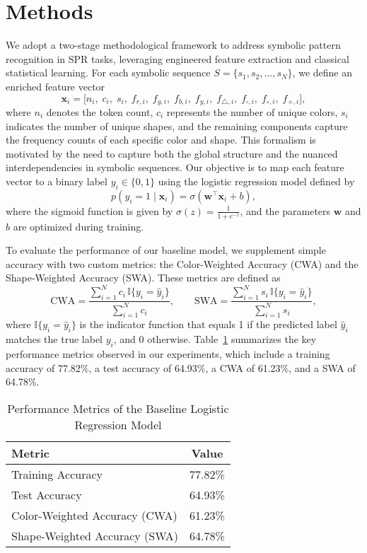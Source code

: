 \documentclass{article}
\begin{document}
\section{Methods}
We adopt a two-stage methodological framework to address symbolic pattern recognition in SPR tasks, leveraging engineered feature extraction and classical statistical learning. For each symbolic sequence \( S = \{s_1, s_2, \dots, s_N\} \), we define an enriched feature vector 
\[
\mathbf{x}_i = \Big[n_i,\; c_i,\; s_i,\; f_{r,i},\; f_{g,i},\; f_{b,i},\; f_{y,i},\; f_{\triangle,i},\; f_{\square,i},\; f_{\circ,i},\; f_{\diamond,i}\Big],
\]
where \( n_i \) denotes the token count, \( c_i \) represents the number of unique colors, \( s_i \) indicates the number of unique shapes, and the remaining components capture the frequency counts of each specific color and shape. This formalism is motivated by the need to capture both the global structure and the nuanced interdependencies in symbolic sequences. Our objective is to map each feature vector to a binary label \( y_i \in \{0,1\} \) using the logistic regression model defined by
\[
p(y_i = 1 \mid \mathbf{x}_i) = \sigma\left(\mathbf{w}^\top \mathbf{x}_i + b\right),
\]
where the sigmoid function is given by \( \sigma(z) = \frac{1}{1+e^{-z}} \), and the parameters \(\mathbf{w}\) and \(b\) are optimized during training.

To evaluate the performance of our baseline model, we supplement simple accuracy with two custom metrics: the Color-Weighted Accuracy (CWA) and the Shape-Weighted Accuracy (SWA). These metrics are defined as
\[
\text{CWA} = \frac{\sum_{i=1}^{N} c_i\, \mathbb{I}\{y_i = \hat{y}_i\}}{\sum_{i=1}^{N} c_i}, \qquad
\text{SWA} = \frac{\sum_{i=1}^{N} s_i\, \mathbb{I}\{y_i = \hat{y}_i\}}{\sum_{i=1}^{N} s_i},
\]
where \( \mathbb{I}\{y_i = \hat{y}_i\} \) is the indicator function that equals 1 if the predicted label \( \hat{y}_i \) matches the true label \( y_i \), and 0 otherwise. Table~\ref{tab:summary} summarizes the key performance metrics observed in our experiments, which include a training accuracy of 77.82\%, a test accuracy of 64.93\%, a CWA of 61.23\%, and a SWA of 64.78\%.

\begin{table}[h]
\centering
\caption{Performance Metrics of the Baseline Logistic Regression Model}
\label{tab:summary}
\begin{tabular}{|l|c|}
\hline
\textbf{Metric} & \textbf{Value} \\
\hline
Training Accuracy & 77.82\% \\
Test Accuracy & 64.93\% \\
Color-Weighted Accuracy (CWA) & 61.23\% \\
Shape-Weighted Accuracy (SWA) & 64.78\% \\
\hline
\end{tabular}
\end{table}
\end{document}
